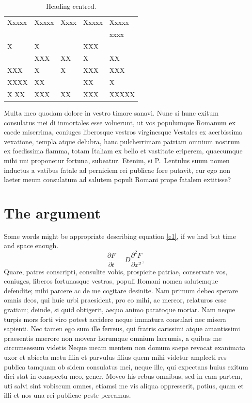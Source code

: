 \documentclass[12pt, a4paper, twoside, english]{report}
\begin{document}
	\begin{table}[htbp!]
		\caption{Heading centred.}
		\label{table:table_tabular}
		\begin{center}
			\begin{tabular}{l|l|lll}
				\hline
				Xxxxx & Xxxxx & Xxxx & Xxxxx & Xxxxx \\
				&       &      &       & xxxx  \\
				\hline
				X     & X     &      & XXX   &       \\
				& XXX   & XX   & X     & XX    \\
				XXX   & X     & X    & XXX   & XXX   \\
				XXXX  & XX    &      & XX    & X     \\
				X XX  & XXX   & XX   & XXX   & XXXXX \\
				\hline
			\end{tabular}
		\end{center} 
	\end{table}
	
	
	Multa meo quodam dolore in vestro timore sanavi. Nunc si hunc exitum
	consulatus mei di inmortales esse voluerunt, ut vos populumque Romanum
	ex caede miserrima, coniuges liberosque vestros virginesque Vestales ex
	acerbissima vexatione, templa atque delubra, hanc pulcherrimam patriam
	omnium nostrum ex foedissima flamma, totam Italiam ex bello et vastitate
	eriperem, quaecumque mihi uni proponetur fortuna, subeatur. Etenim, si
	P.~Lentulus suum nomen inductus a vatibus fatale ad perniciem rei
	publicae fore putavit, cur ego non laeter meum consulatum ad salutem
	populi Romani prope fatalem extitisse?
	
	
	\chapter{The argument}
	Some words might be appropriate describing equation \ref{e1}, if we
	had but time and space enough.
	\begin{equation}
		\frac{\partial F}{\partial
			t}=D\frac{\partial^2 F}{\partial x^2},
		\label{e1}
	\end{equation}
	Quare, patres conscripti, consulite vobis, prospicite patriae,
	conservate vos, coniuges, liberos fortunasque vestras, populi Romani
	nomen salutemque defendite; mihi parcere ac de me cogitare desinite. Nam
	primum debeo sperare omnis deos, qui huic urbi praesident, pro eo mihi,
	ac mereor, relaturos esse gratiam; deinde, si quid obtigerit, aequo
	animo paratoque moriar. Nam neque turpis mors forti viro potest accidere
	neque immatura consulari nec misera sapienti. Nec tamen ego sum ille
	ferreus, qui fratris carissimi atque amantissimi praesentis maerore non
	movear horumque omnium lacrumis, a quibus me circumsessum videtis Neque
	meam mentem non domum saepe revocat exanimata uxor et abiecta metu filia
	et parvulus filius quem mihi videtur amplecti res publica tamquam ob
	sidem consulatus mei, neque ille, qui expectans huius exitum diei stat
	in conspectu meo, gener. Moveo his rebus omnibus, sed in eam partem, uti
	salvi sint vobiscum omnes, etiamsi me vis aliqua oppresserit, potius,
	quam et illi et nos una rei publicae peste pereamus.
	
\end{document}
